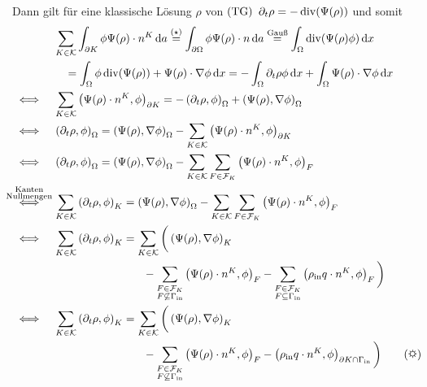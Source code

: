 Dann gilt für eine klassische Lösung $ \rho $ von $ \operatorname{(TG)} $  $ \partial_t \rho = - \operatorname{div}(\Psi(\rho)) $ und somit
\begin{align*}
	&&&\sum_{K \in \mathcal{K}} \int_{\partial K} \phi \Psi(\rho) \cdot n^K \diff a \stackrel{(\star)}{=} \int_{\partial \Omega} \phi \Psi(\rho) \cdot n \diff a \stackrel{\text{Gauß}}{=} \int_{\Omega} \dive(\Psi(\rho) \phi) \diff x \\
	&&& \quad = \int_{\Omega} \phi \dive(\Psi(\rho)) + \Psi(\rho) \cdot \nabla \phi \diff x = - \int_\Omega \partial_t \rho \phi \diff x + \int_\Omega \Psi(\rho) \cdot \nabla \phi \diff x \\
	&\iff &&\sum_{K \in \mathcal{K}} \left(\Psi(\rho) \cdot n^K, \phi \right)_{\partial K} = - \left(\partial_t \rho, \phi  \right)_\Omega + \left(\Psi(\rho), \nabla\phi  \right)_\Omega \\
	&\iff && \left(\partial_t \rho, \phi  \right)_\Omega  =  \left(\Psi(\rho), \nabla\phi  \right)_\Omega - \sum_{K \in \mathcal{K} } \left(\Psi(\rho) \cdot n^K, \phi \right)_{\partial K} \\
	&\iff &&\left(\partial_t \rho, \phi  \right)_\Omega  =  \left(\Psi(\rho), \nabla \phi  \right)_\Omega - \sum_{K \in \mathcal{K}} \sum_{F \in \mathcal{F}_K} \left(\Psi(\rho) \cdot n^K, \phi \right)_{F} \\
	&\stackrel{\mathclap{\substack{\text{Kanten} \\ \text{Nullmengen}}}}{\iff} &&\sum_{K \in \mathcal{K}} \left(\partial_t \rho, \phi  \right)_K  =  \left(\Psi(\rho), \nabla \phi  \right)_\Omega - \sum_{K \in \mathcal{K}} \sum_{F \in \mathcal{F}_K} \left(\Psi(\rho) \cdot n^K, \phi \right)_{F} \\
	&\iff  &&\sum_{K \in \mathcal{K}} \left(\partial_t \rho, \phi  \right)_K  = \sum_{K \in \mathcal{K}} \bigg(  \left(\Psi(\rho), \nabla \phi \right)_K\\
	&&&\qquad\qquad\qquad\qquad -\sum_{\substack{F \in \mathcal{F}_K \\ F \not\subseteq \Gammain}} \left(\Psi(\rho) \cdot n^K, \phi \right)_{F}- \sum_{\substack{F \in \mathcal{F}_K \\ F \subseteq \Gammain}} \left(\rhoin q \cdot n^K, \phi \right)_{F} \bigg)\\
	&\iff  &&\sum_{K \in \mathcal{K}} \left(\partial_t \rho, \phi  \right)_K  = \sum_{K \in \mathcal{K}} \bigg( \left(\Psi(\rho), \nabla\phi \right)_K \\
	&&& \qquad\qquad\qquad\qquad -\sum_{\substack{F \in \mathcal{F}_K \\ F \not\subseteq \Gammain}} \left(\Psi(\rho) \cdot n^K, \phi \right)_{F} - \left(\rhoin q \cdot n^K, \phi \right)_{\partial K \cap \Gammain} \bigg) \tag{\sun}
\end{align*}
